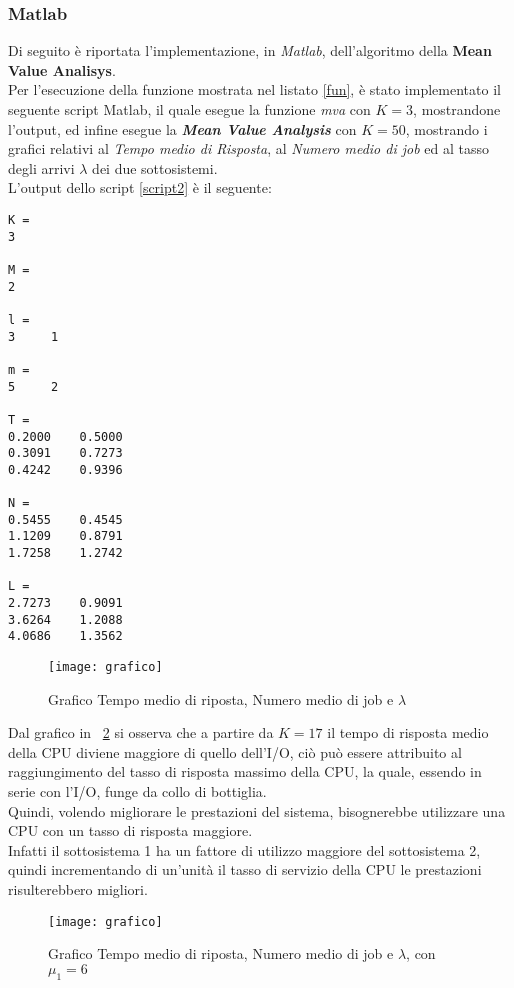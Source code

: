 \clearpage

\subsubsection{Matlab}
Di seguito è riportata l'implementazione, in \textit{Matlab}, dell'algoritmo
della \textbf{Mean Value Analisys}.\\


Per l'esecuzione della funzione mostrata nel listato \ref{fun}, è stato implementato
 il seguente script Matlab, il quale esegue la funzione \textit{mva} con $K=3$,
 mostrandone l'output, ed infine esegue la \textbf{\textit{Mean Value Analysis}} con
 $K=50$, mostrando i grafici relativi al \textit{Tempo medio di Risposta},
 al \textit{Numero medio di job} ed al tasso degli arrivi $\lambda$
 dei due sottosistemi.\\



\vspace{0.4cm}
L'output dello script \ref{script2} è il seguente:

\color{black} \begin{verbatim}
K =
3

M =
2

l =
3     1

m =
5     2

T =
0.2000    0.5000
0.3091    0.7273
0.4242    0.9396

N =
0.5455    0.4545
1.1209    0.8791
1.7258    1.2742

L =
2.7273    0.9091
3.6264    1.2088
4.0686    1.3562
\end{verbatim} \color{black}

\begin{figure}[!htbp]
  \centering
  \texttt{[image: grafico]}
  \caption{Grafico Tempo medio di riposta, Numero medio di job e $\lambda$}
  \label{graph1}
\end{figure}

Dal grafico in \figurename~\ref{graph1} si osserva che a partire da $K=17$ il
tempo di risposta medio della CPU diviene maggiore di quello dell'I/O, ciò può
essere attribuito al raggiungimento del tasso di risposta massimo della CPU,
la quale, essendo in serie con l'I/O, funge da collo di bottiglia.\\
Quindi, volendo migliorare le prestazioni del sistema, bisognerebbe utilizzare
una CPU con un tasso di risposta maggiore.\\
Infatti il sottosistema 1 ha un fattore di utilizzo maggiore del sottosistema 2,
quindi incrementando di un'unità il tasso di servizio della CPU le prestazioni
risulterebbero migliori.\\

\begin{figure}[!htbp]
  \centering
  \texttt{[image: grafico]}
  \caption{Grafico Tempo medio di riposta, Numero medio di job e $\lambda$, con $\mu_1=6$}
  \label{graph1}
\end{figure}
